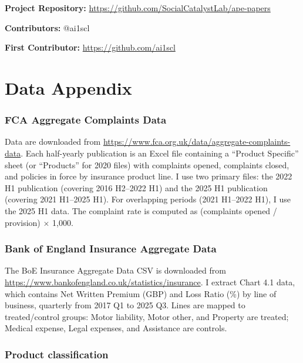 \documentclass[12pt]{article}
\begin{document}
\noindent\textbf{Project Repository:} \url{https://github.com/SocialCatalystLab/ape-papers}

\noindent\textbf{Contributors:} @ai1scl

\noindent\textbf{First Contributor:} \url{https://github.com/ai1scl}

\label{apep_main_text_end}
\newpage


\newpage
\appendix

\section{Data Appendix}

\subsubsection*{FCA Aggregate Complaints Data} Data are downloaded from \url{https://www.fca.org.uk/data/aggregate-complaints-data}. Each half-yearly publication is an Excel file containing a ``Product Specific'' sheet (or ``Products'' for 2020 files) with complaints opened, complaints closed, and policies in force by insurance product line. I use two primary files: the 2022 H1 publication (covering 2016 H2--2022 H1) and the 2025 H1 publication (covering 2021 H1--2025 H1). For overlapping periods (2021 H1--2022 H1), I use the 2025 H1 data. The complaint rate is computed as (complaints opened / provision) $\times$ 1,000.

\subsubsection*{Bank of England Insurance Aggregate Data} The BoE Insurance Aggregate Data CSV is downloaded from \url{https://www.bankofengland.co.uk/statistics/insurance}. I extract Chart 4.1 data, which contains Net Written Premium (GBP) and Loss Ratio (\%) by line of business, quarterly from 2017 Q1 to 2025 Q3. Lines are mapped to treated/control groups: Motor liability, Motor other, and Property are treated; Medical expense, Legal expenses, and Assistance are controls.

\subsubsection*{Product classification}
\end{document}

